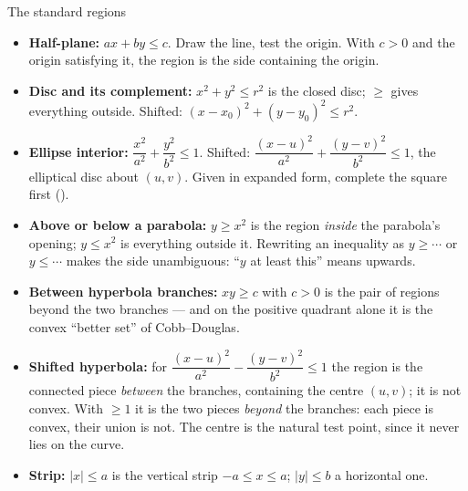 \begin{rulebox}{The standard regions}
\begin{itemize}[leftmargin=1.6em,itemsep=0.3ex]
  \item \textbf{Half-plane:} $ax+by\le c$. Draw the line, test the origin.
        With $c>0$ and the origin satisfying it, the region is the side
        containing the origin.
  \item \textbf{Disc and its complement:} $x^{2}+y^{2}\le r^{2}$ is the
        closed disc; $\ge$ gives everything outside. Shifted:
        $(x-x_{0})^{2}+(y-y_{0})^{2}\le r^{2}$.
  \item \textbf{Ellipse interior:} $\dfrac{x^{2}}{a^{2}}
        +\dfrac{y^{2}}{b^{2}}\le1$. Shifted:
        $\dfrac{(x-u)^{2}}{a^{2}}+\dfrac{(y-v)^{2}}{b^{2}}\le1$, the
        elliptical disc about $(u,v)$. Given in expanded form, complete the
        square first ().
  \item \textbf{Above or below a parabola:} $y\ge x^{2}$ is the region
        \emph{inside} the parabola's opening; $y\le x^{2}$ is everything
        outside it. Rewriting an inequality as $y\ge\cdots$ or
        $y\le\cdots$ makes the side unambiguous: ``$y$ at least this'' means
        upwards.
  \item \textbf{Between hyperbola branches:} $xy\ge c$ with $c>0$ is the
        pair of regions beyond the two branches --- and on the positive
        quadrant alone it is the convex ``better set'' of Cobb--Douglas.
  \item \textbf{Shifted hyperbola:} for
        $\dfrac{(x-u)^{2}}{a^{2}}-\dfrac{(y-v)^{2}}{b^{2}}\le1$ the region is
        the connected piece \emph{between} the branches, containing the
        centre $(u,v)$; it is not convex. With $\ge1$ it is the two pieces
        \emph{beyond} the branches: each piece is convex, their union is
        not. The centre is the natural test point, since it never lies on
        the curve.
  \item \textbf{Strip:} $|x|\le a$ is the vertical strip $-a\le x\le a$;
        $|y|\le b$ a horizontal one.
\end{itemize}
\end{rulebox}

